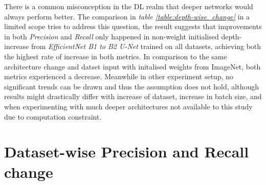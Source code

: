 \documentclass[11pt, a4paper, twoside]{report}
\begin{document}
There is a common misconception in the DL realm that deeper networks would always perform better. The comparison in \textit{table \ref{table:depth-wise_change}} in a limited scope tries to address this question, the result suggests that improvements in both \textit{Precision} and \textit{Recall} only happened in non-weight initialised depth-increase from \textit{EfficientNet B1 to B2 U-Net} trained on all datasets, achieving both the highest rate of increase in both metrics. In comparison to the same architecture change and datset input with initalised weights from ImageNet, both metrics experienced a decrease. Meanwhile in other experiment setup, no significant trends can be drawn and thus the assumption does not hold, although results might drastically differ with increase of dataset, increase in batch size, and when experimenting with much deeper architectures not available to this study due to computation constraint.\\\par

\section{Dataset-wise Precision and Recall change}

\begin{table}[H]
  \centering
  \label{table:data-wise_change}
  \caption{Changes when the Dzaleka and Dzaleka North datasets were introduced to each setup.}
\end{table}
\end{document}
